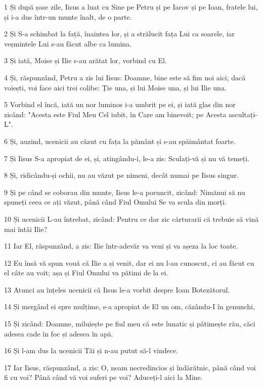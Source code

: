 \par 1 Și după șase zile, Iisus a luat cu Sine pe Petru și pe Iacov și pe Ioan, fratele lui, și i-a dus într-un munte înalt, de o parte.
\par 2 Și S-a schimbat la față, înaintea lor, și a strălucit fața Lui ca soarele, iar veșmintele Lui s-au făcut albe ca lumina.
\par 3 Și iată, Moise și Ilie s-au arătat lor, vorbind cu El.
\par 4 Și, răspunzând, Petru a zis lui Iisus: Doamne, bine este să fim noi aici; dacă voiești, voi face aici trei colibe: Ție una, și lui Moise una, și lui Ilie una.
\par 5 Vorbind el încă, iată un nor luminos i-a umbrit pe ei, și iată glas din nor zicând: "Acesta este Fiul Meu Cel iubit, în Care am binevoit; pe Acesta ascultați-L".
\par 6 Și, auzind, ucenicii au căzut cu fața la pământ și s-au spăimântat foarte.
\par 7 Și Iisus S-a apropiat de ei, și, atingându-i, le-a zis: Sculați-vă și nu vă temeți.
\par 8 Și, ridicându-și ochii, nu au văzut pe nimeni, decât numai pe Iisus singur.
\par 9 Și pe când se coborau din munte, Iisus le-a poruncit, zicând: Nimănui să nu spuneți ceea ce ați văzut, până când Fiul Omului Se va scula din morți.
\par 10 Și ucenicii L-au întrebat, zicând: Pentru ce dar zic cărturarii că trebuie să vină mai întâi Ilie?
\par 11 Iar El, răspunzând, a zis: Ilie într-adevăr va veni și va așeza la loc toate.
\par 12 Eu însă vă spun vouă că Ilie a și venit, dar ei nu l-au cunoscut, ci au făcut cu el câte au voit; așa și Fiul Omului va pătimi de la ei.
\par 13 Atunci au înțeles ucenicii că Iisus le-a vorbit despre Ioan Botezătorul.
\par 14 Și mergând ei spre mulțime, s-a apropiat de El un om, căzându-I în genunchi,
\par 15 Și zicând: Doamne, miluiește pe fiul meu că este lunatic și pătimește rău, căci adesea cade în foc și adesea în apă.
\par 16 Și l-am dus la ucenicii Tăi și n-au putut să-l vindece.
\par 17 Iar Iisus, răspunzând, a zis: O, neam necredincios și îndărătnic, până când voi fi cu voi? Până când vă voi suferi pe voi? Aduceți-l aici la Mine.
